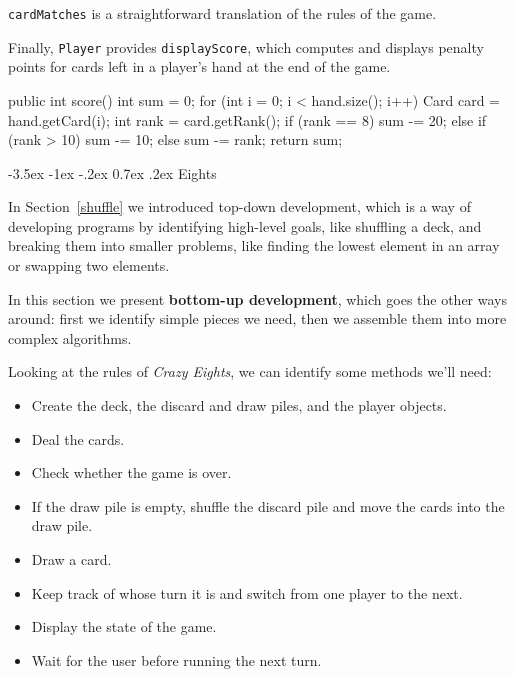 \documentclass[12pt]{book}
\makeatletter
\theoremstyle{exercise}
\newcommand{\java}[1]{\verb"#1"}
\renewcommand{\section}{\@startsection{section}{1}{\z@}%
    {-3.5ex \@plus -1ex \@minus -.2ex}%
    {0.7ex \@plus.2ex}%
    {\normalfont\Large\bfseries}}
\newcommand{\java}[1]{\lstinline{#1}} %
\makeatother
\begin{document}
\java{cardMatches} is a straightforward translation of the rules of the game.

Finally, \java{Player} provides \java{displayScore}, which computes and displays penalty points for cards left in a player's hand at the end of the game.

\begin{code}
    public int score() {
        int sum = 0;
        for (int i = 0; i < hand.size(); i++) {
            Card card = hand.getCard(i);
            int rank = card.getRank();
            if (rank == 8) {
                sum -= 20;
            } else if (rank > 10) {
                sum -= 10;
            } else {
                sum -= rank;
            }
        }
        return sum;
    }
\end{code}


\section{Eights}

In Section~\ref{shuffle} we introduced top-down development, which is a way of developing programs by identifying high-level goals, like shuffling a deck, and breaking them into smaller problems, like finding the lowest element in an array or swapping two elements.

In this section we present {\bf bottom-up development}, which goes the other ways around: first we identify simple pieces we need, then we assemble them into more complex algorithms.

Looking at the rules of {\em Crazy Eights}, we can identify some methods we'll need:

\begin{itemize}

\item Create the deck, the discard and draw piles, and the player objects.

\item Deal the cards.

\item Check whether the game is over.

\item If the draw pile is empty, shuffle the discard pile and move the cards into the draw pile.

\item Draw a card.

\item Keep track of whose turn it is and switch from one player to the next.

\item Display the state of the game.

\item Wait for the user before running the next turn.

\end{itemize}
\end{document}
